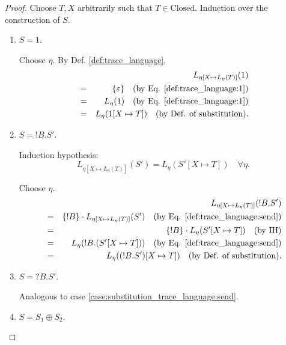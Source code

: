 \documentclass{llncs}
\newcommand*{\Closed}{\mathrm{Closed}}
\newcommand*{\send}{\mathord{!}}
\newcommand*{\recv}{\mathord{?}}
\newcommand*{\echoice}{\oplus}
\newcommand*{\concat}{\cdot}
\renewcommand*{\|}{\;|\;}
\renewcommand*{\epsilon}{\varepsilon}
\begin{document}
\begin{proof}
  Choose $T, X$ arbitrarily such that $T \in \Closed$. Induction over the
  construction of $S$.
  \begin{enumerate}
    \item
      \label{case:substitution_trace_language:1}
      $S = 1$.

      Choose $\eta$. By Def. \ref{def:trace_language},
      \begin{eqnarray*}
        &&  L_{\eta[X \mapsto L_\eta(T)]}(1) \\
        &=& \{\epsilon\}
            \quad \text{(by Eq. \ref{def:trace_language:1})} \\
        &=& L_\eta(1)
            \quad \text{(by Eq. \ref{def:trace_language:1})} \\
        &=& L_\eta(1[X \mapsto T])
            \quad \text{(by Def. of substitution)}.
      \end{eqnarray*}

    \item
      \label{case:substitution_trace_language:send}
      $S = \send B.S'$.

      Induction hypothesis:
      \begin{equation*}
        L_{\eta[X \mapsto L_\eta(T)]}(S') = L_\eta(S'[X \mapsto T]) \quad \forall \eta.
      \end{equation*}

      Choose $\eta$.
      \begin{eqnarray*}
        &&  L_{\eta[X \mapsto L_\eta(T)]}(\send B.S') \\
        &=& \{\send B\} \concat L_{\eta[X \mapsto L_\eta(T)]}(S')
            \quad \text{(by Eq. \ref{def:trace_language:send})} \\
        &=& \{\send B\} \concat L_\eta(S'[X \mapsto T])
            \quad \text{(by IH)} \\
        &=& L_\eta(\send B.(S'[X \mapsto T]))
            \quad \text{(by Eq. \ref{def:trace_language:send})} \\
        &=& L_\eta((\send B.S')[X \mapsto T])
            \quad \text{(by Def. of substitution)}.
      \end{eqnarray*}

    \item
      \label{case:substitution_trace_language:recv}
      $S = \recv B.S'$.

      Analogous to case \ref{case:substitution_trace_language:send}.

    \item
      \label{case:substitution_trace_language:echoice}
      $S = S_1 \echoice S_2$.


\end{enumerate}
\end{proof}
\end{document}
